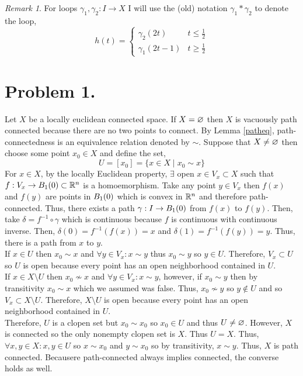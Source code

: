 \documentclass[12pt]{extarticle}
\theoremstyle{remark}
\newtheorem*{remark}{Remark}
\begin{document}
\begin{remark}
For loops $\gamma_1, \gamma_2 : I \to X$ I will use the (old) notation $\gamma_1 * \gamma_2$ to denote the loop, \[h(t) = \begin{cases} \gamma_2(2t) & t \le \frac{1}{2} \\ \gamma_1(2t - 1) & t \ge \frac{1}{2} \end{cases}\]
\end{remark} 

\section*{Problem 1.}
Let $X$ be a locally euclidean connected space. If $X = \varnothing$ then $X$ is vacuously path connected because there are no two points to connect.
By Lemma \ref{patheq}, path-connectedness is an equivalence relation denoted by $\sim$. Suppose that $X \neq \varnothing$ then choose some point $x_0 \in X$ and define the set,
\[U = [x_0] = \{ x \in X \mid x_0 \sim x \}\]
For $x \in X$, by the locally Euclidean property, $\exists$ open $x \in V_x \subset X$ such that $f: V_x \to B_1(0) \subset \mathbb{R}^n$ is a homoemorphism. Take any point $y \in V_x$ then $f(x)$ and $f(y)$ are points in $B_{1} \! \left(0 \right)$ which is convex in $\mathbb{R}^n$ and therefore path-connected. Thus, there exists a path $\gamma : I \to B_{1} \! \left(0 \right)$ from $f(x)$ to $f(y)$. Then, take $\delta = f^{-1} \circ \gamma$ which is continuous because $f$ is continuous with continuous inverse. Then, $\delta(0) = f^{-1}(f(x)) = x$ and $\delta(1) = f^{-1}(f(y)) = y$. Thus, there is a path from $x$ to $y$. \bigskip \\
If $x \in U$ then $x_0 \sim x$ and $\forall y \in V_x : x \sim y$ thus $x_0 \sim y$ so $y \in U$. Therefore, $V_x \subset U$ so $U$ is open because every point has an open neighborhood contained in $U$. \bigskip \\
If $x \in X \setminus U$ then $x_0 \not\sim x$ and $\forall y \in V_x : x \sim y$, however, if $x_0 \sim y$ then by transitivity $x_0 \sim x$ which we assumed was false. Thus, $x_0 \not\sim y$ so $y \notin U$ and so $V_x \subset X \setminus U$. Therefore, $X \setminus U$ is open because every point has an open neighborhood contained in $U$. \bigskip \\
Therefore, $U$ is a clopen set but $x_0 \sim x_0$ so $x_0 \in U$ and thus $U \neq \varnothing$. However, $X$ is connected so the only nonempty clopen set is $X$. Thus $U = X$. Thus, $\forall x,y \in X : x, y \in U$ so $x \sim x_0$ and $y \sim x_0$ so by transitivity, $x \sim y$. Thus, $X$ is path connected. Becausere path-connected always implies connected, the converse holds as well. 
\end{document}

